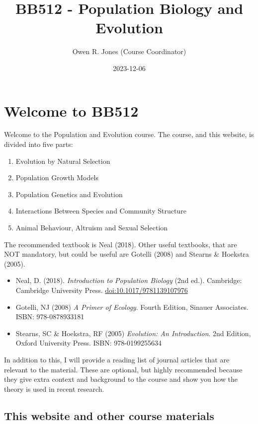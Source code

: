 \documentclass[
  a4paper]{book}
\title{BB512 - Population Biology and Evolution}
\author{Owen R. Jones (Course Coordinator)}
\date{2023-12-06}
\providecommand{\tightlist}{%
  \setlength{\itemsep}{0pt}\setlength{\parskip}{0pt}}
\begin{document}
\maketitle

{
\setcounter{tocdepth}{1}
\tableofcontents
}
\hypertarget{welcome-to-bb512}{%
\chapter{Welcome to BB512}\label{welcome-to-bb512}}

Welcome to the Population and Evolution course.
The course, and this website, is divided into five parts:

\begin{enumerate}
\def\labelenumi{\arabic{enumi}.}
\tightlist
\item
  Evolution by Natural Selection
\item
  Population Growth Models
\item
  Population Genetics and Evolution
\item
  Interactions Between Species and Community Structure
\item
  Animal Behaviour, Altruism and Sexual Selection
\end{enumerate}

The recommended textbook is Neal (2018). Other useful textbooks, that are NOT mandatory, but could be useful are Gotelli (2008) and Stearns \& Hoekstra (2005).

\begin{itemize}
\tightlist
\item
  Neal, D. (2018). \emph{Introduction to Population Biology} (2nd ed.). Cambridge: Cambridge University Press. \url{doi:10.1017/9781139107976}
\item
  Gotelli, NJ (2008) \emph{A Primer of Ecology}. Fourth Edition, Sinauer Associates. ISBN: 978-0878933181
\item
  Stearns, SC \& Hoekstra, RF (2005) \emph{Evolution: An Introduction}. 2nd Edition, Oxford University Press. ISBN: 978-0199255634
\end{itemize}

In addition to this, I will provide a reading list of journal articles that are relevant to the material. These are optional, but highly recommended because they give extra context and background to the course and show you how the theory is used in recent research.

\hypertarget{this-website-and-other-course-materials}{%
\section{This website and other course materials}\label{this-website-and-other-course-materials}}
\end{document}
